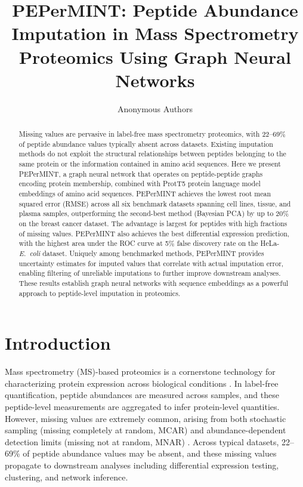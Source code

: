 \documentclass[12pt]{article}
\title{PEPerMINT: Peptide Abundance Imputation in Mass Spectrometry Proteomics Using Graph Neural Networks}
\author{Anonymous Authors}
\date{}
\begin{document}
\maketitle

\begin{abstract}
Missing values are pervasive in label-free mass spectrometry proteomics, with 22--69\% of peptide abundance values typically absent across datasets. Existing imputation methods do not exploit the structural relationships between peptides belonging to the same protein or the information contained in amino acid sequences. Here we present PEPerMINT, a graph neural network that operates on peptide-peptide graphs encoding protein membership, combined with ProtT5 protein language model embeddings of amino acid sequences. PEPerMINT achieves the lowest root mean squared error (RMSE) across all six benchmark datasets spanning cell lines, tissue, and plasma samples, outperforming the second-best method (Bayesian PCA) by up to 20\% on the breast cancer dataset. The advantage is largest for peptides with high fractions of missing values. PEPerMINT also achieves the best differential expression prediction, with the highest area under the ROC curve at 5\% false discovery rate on the HeLa-\textit{E.\ coli} dataset. Uniquely among benchmarked methods, PEPerMINT provides uncertainty estimates for imputed values that correlate with actual imputation error, enabling filtering of unreliable imputations to further improve downstream analyses. These results establish graph neural networks with sequence embeddings as a powerful approach to peptide-level imputation in proteomics.
\end{abstract}

\section{Introduction}

Mass spectrometry (MS)-based proteomics is a cornerstone technology for characterizing protein expression across biological conditions \citep{aebersold2003mass, cox2014accurate}. In label-free quantification, peptide abundances are measured across samples, and these peptide-level measurements are aggregated to infer protein-level quantities. However, missing values are extremely common, arising from both stochastic sampling (missing completely at random, MCAR) and abundance-dependent detection limits (missing not at random, MNAR) \citep{lazar2016accounting, webb2018imputation}. Across typical datasets, 22--69\% of peptide abundance values may be absent, and these missing values propagate to downstream analyses including differential expression testing, clustering, and network inference.
\end{document}
